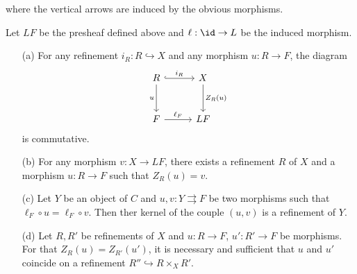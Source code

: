 where the vertical arrows are induced by the obvious morphisms.
\begin{lemma}\label{site small generated sheafification lemma}
Let $LF$ be the presheaf defined above and $\ell:\id\to L$ be the induced morphism.
\begin{enumerate}
\item[(a)] For any refinement $i_R:R\hookrightarrow X$ and any morphism $u:R\to F$, the diagram
\begin{equation}\label{site small generated sheafification-4}
\begin{tikzcd}[row sep=10mm, column sep=10mm]
R\ar[r,hook,"i_R"]\ar[d,swap,"u"]&X\ar[d,"Z_R(u)"]\\
F\ar[r,"\ell_F"]&LF
\end{tikzcd}
\end{equation}
is commutative.
\item[(b)] For any morphism $v:X\to LF$, there exists a refinement $R$ of $X$ and a morphism $u:R\to F$ such that $Z_R(u)=v$. 
\item[(c)] Let $Y$ be an object of $C$ and $u,v:Y\rightrightarrows F$ be two morphisms such that $\ell_F\circ u=\ell_F\circ v$. Then ther kernel of the couple $(u,v)$ is a refinement of $Y$.
\item[(d)] Let $R,R'$ be refinements of $X$ and $u:R\to F$, $u':R'\to F$ be morphisms. For that $Z_R(u)=Z_{R'}(u')$, it is necessary and sufficient that $u$ and $u'$ coincide on a refinement $R''\hookrightarrow R\times_XR'$.
\end{enumerate}
\end{lemma}
